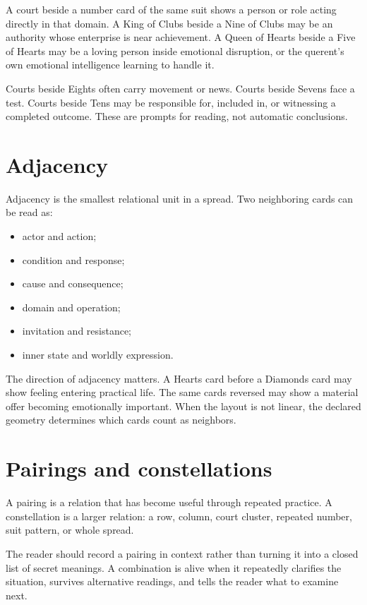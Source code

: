 A court beside a number card of the same suit shows a person or role acting
directly in that domain. A King of Clubs beside a Nine of Clubs may be an
authority whose enterprise is near achievement. A Queen of Hearts beside a Five
of Hearts may be a loving person inside emotional disruption, or the querent's
own emotional intelligence learning to handle it.

Courts beside Eights often carry movement or news. Courts beside Sevens face a
test. Courts beside Tens may be responsible for, included in, or witnessing a
completed outcome. These are prompts for reading, not automatic conclusions.

\section{Adjacency}

Adjacency is the smallest relational unit in a spread. Two neighboring cards
can be read as:

\begin{itemize}
\item actor and action;
\item condition and response;
\item cause and consequence;
\item domain and operation;
\item invitation and resistance;
\item inner state and worldly expression.
\end{itemize}

The direction of adjacency matters. A Hearts card before a Diamonds card may
show feeling entering practical life. The same cards reversed may show a
material offer becoming emotionally important. When the layout is not linear,
the declared geometry determines which cards count as neighbors.

\section{Pairings and constellations}

A pairing is a relation that has become useful through repeated practice. A
constellation is a larger relation: a row, column, court cluster, repeated
number, suit pattern, or whole spread.

The reader should record a pairing in context rather than turning it into a
closed list of secret meanings. A combination is alive when it repeatedly
clarifies the situation, survives alternative readings, and tells the reader
what to examine next.


